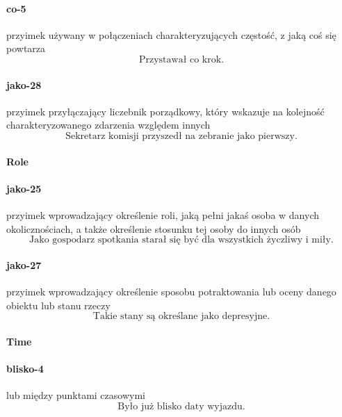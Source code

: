 \documentclass[a4paper, 12pt]{article}
\theoremstyle{remark}
\begin{document}
\paragraph{co-5} \label{prep-5}	przyimek używany w połączeniach charakteryzujących częstość, z jaką coś się powtarza
\begin{equation}
\text{Przystawał co krok.}
\end{equation}
\paragraph{jako-28} \label{prep-28}	przyimek przyłączający liczebnik porządkowy, który wskazuje na kolejność charakteryzowanego zdarzenia względem innych
\begin{equation}
\text{Sekretarz komisji przyszedł na zebranie jako pierwszy.}
\end{equation}

\paragraph{Role} %
\label{sub:role}
\paragraph{jako-25} \label{prep-25}	przyimek wprowadzający określenie roli, jaką pełni jakaś osoba w danych okolicznościach, a także określenie stosunku tej osoby do innych osób
\begin{equation}
\text{Jako gospodarz spotkania starał się być dla wszystkich życzliwy i miły.}
\end{equation}
\paragraph{jako-27} \label{prep-27}	przyimek wprowadzający określenie sposobu potraktowania lub oceny danego obiektu lub stanu rzeczy
\begin{equation}
\text{Takie stany są określane jako depresyjne.}
\end{equation}

\paragraph{Time} %
\label{sub:time}
\paragraph{blisko-4} \label{prep-4}	lub między punktami czasowymi
\begin{equation}
\text{Było już blisko daty wyjazdu.}
\end{equation}
\end{document}
